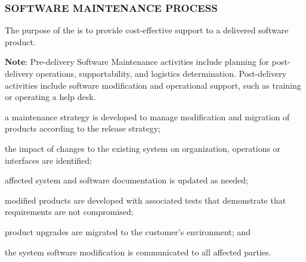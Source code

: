 		\newpage
		\subsubsection{SOFTWARE MAINTENANCE PROCESS\label{proc:software_maintenance_process}}

			\begin{adjustwidth}{2em}{0pt}  

				The purpose of the  is to provide cost-effective support to a delivered software product.

				{\bf Note}: Pre-delivery Software Maintenance activities include planning for post-delivery operations, supportability, and logistics determination. Post-delivery activities include software modification and operational support, such as training or operating a help desk.

			\end{adjustwidth}

			\begin{adjustwidth}{2em}{0pt} 

				\begin{compactitem}

					\item a maintenance strategy is developed to manage modification and migration of products according to the release strategy;

					\item the impact of changes to the existing system on organization, operations or interfaces are identified;

					\item affected system and software documentation is updated as needed;

					\item modified products are developed with associated tests that demonstrate that requirements are not compromised;

					\item product upgrades are migrated to the customer’s environment; and

					\item the system software modification is communicated to all affected parties.

				\end{compactitem}

			\end{adjustwidth}

